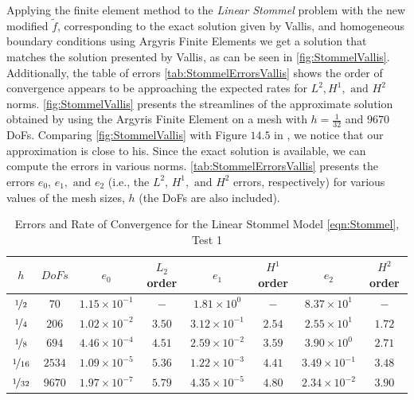 Applying the finite element method to the \emph{Linear Stommel} problem with the
new modified $\tilde{f}$, corresponding to the exact solution given by Vallis,
and homogeneous boundary conditions using Argyris Finite Elements we get a
solution that matches the solution presented by Vallis, as can be seen in
\autoref{fig:StommelVallis}. Additionally, the table of errors
\autoref{tab:StommelErrorsVallis} shows the order of convergence appears to be
approaching the expected rates for $L^2, H^1, \text{ and } H^2$ norms.
\autoref{fig:StommelVallis} presents the streamlines of the approximate solution
obtained by using the Argyris Finite Element on a mesh with $h=\frac{1}{32}$ and
$9670$ DoFs. Comparing \autoref{fig:StommelVallis} with Figure $14.5$ in
\cite{Vallis06}, we notice that our approximation is close to his. Since the
exact solution is available, we can compute the errors in various norms.
\autoref{tab:StommelErrorsVallis} presents the errors $e_0,\, e_1, \text{ and }
e_2$ (i.e., the $L^2,\, H^1, \text{ and } H^2$ errors, respectively) for various
values of the mesh sizes, $h$ (the DoFs are also included).

\begin{table}%
\begin{center}
\begin{tabular}{|c|c|c|c|c|c|c|c|}%
  \hline
  $h$ & $DoFs$ & $e_0$ & $L_2$ order & $e_1$ & $H^1$ order & $e_2$ & $H^2$ order \\[0.2em] %
  \hline
  $\nicefrac{1}{2}$ & $70$ & $1.15\times 10^{-1}$ & $-$ & $1.81\times 10^0$ & $-$ & $8.37\times 10^1$ & $-$ \\[0.2em] %
  $\nicefrac{1}{4}$ & $206$ & $1.02\times 10^{-2}$ & $3.50$ & $3.12\times 10^{-1}$ & $2.54$ & $2.55\times 10^1$ & $1.72$ \\[0.2em] %
  $\nicefrac{1}{8}$ & $694$ & $4.46\times 10^{-4}$ & $4.51$ & $2.59\times 10^{-2}$ & $3.59$ & $3.90\times 10^0$ & $2.71$ \\[0.2em] %
  $\nicefrac{1}{16}$ & $2534$ & $1.09\times 10^{-5}$ & $5.36$ & $1.22\times 10^{-3}$ & $4.41$ & $3.49\times 10^{-1}$ & $3.48$ \\[0.2em] %
  $\nicefrac{1}{32}$ & $9670$ & $1.97\times 10^{-7}$ & $5.79$ & $4.35\times 10^{-5}$ & $4.80$ & $2.34\times 10^{-2}$ & $3.90$ \\[0.2em] %
  \hline
\end{tabular}
\end{center}
\caption{Errors and Rate of Convergence for the Linear Stommel Model \eqref{eqn:Stommel}, Test 1 \cite{Vallis06}}
\label{tab:StommelErrorsVallis}
\end{table}

